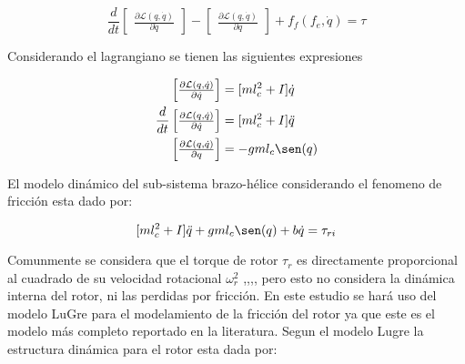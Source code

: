 \documentclass[a4paper]{IEEEtran} %
\begin{document}
\begin{equation}
    \frac{d}{dt}\begin{bmatrix}
        \frac{\partial \mathcal{L}(q,\dot{q})}{\partial\dot{q}}
    \end{bmatrix}-\begin{bmatrix}
        \frac{\partial \mathcal{L}(q,\dot{q})}{\partial q}
    \end{bmatrix}+f_f(f_e,\dot{q})=\tau
    \label{eq:eu_lagran}
\end{equation}

Considerando el lagrangiano se tienen las siguientes expresiones

\begin{equation}
    \begin{split}
        \begin{bmatrix}
            \frac{\partial \mathcal{L}(q,\dot{q})}{\partial\dot{q}}
        \end{bmatrix}&=\lbrack ml_c^2+I\rbrack\dot{q}\\
        \frac{d}{dt}\begin{bmatrix}
            \frac{\partial\mathcal{L}(q,\dot{q})}{\partial\dot{q}}
        \end{bmatrix}&=\lbrack ml_c^2+I\rbrack\ddot{q}\\
        \begin{bmatrix}
            \frac{\partial \mathcal{L}(q,\dot{q})}{\partial q}
        \end{bmatrix}&=-gml_c\sen(q)\\
    \end{split}
    \label{eq:dq}
\end{equation}

El modelo dinámico del sub-sistema brazo-hélice considerando el fenomeno de fricción esta dado por:

\begin{equation}
    \lbrack ml_c^2+I\rbrack\ddot{q}+gml_c\sen(q)+b\dot{q}=\tau_{ri}
    \label{eq:din_model}
\end{equation}

Comunmente se considera que el torque de rotor $\tau_r$ es directamente proporcional al cuadrado de su velocidad rotacional $\omega^2_r$ \cite{nemati2014modeling},\cite{schulz2015high},\cite{koehl2012aerodynamic},\cite{mellinger2012trajectory}, pero esto no considera la dinámica interna del rotor, ni las perdidas por fricción. En este estudio se hará uso del modelo LuGre para el modelamiento de la fricción del rotor ya que este es el modelo más completo reportado en la literatura\cite{reyes2019drones}.
Segun el modelo Lugre la estructura dinámica para el rotor esta dada por:
\end{document}
